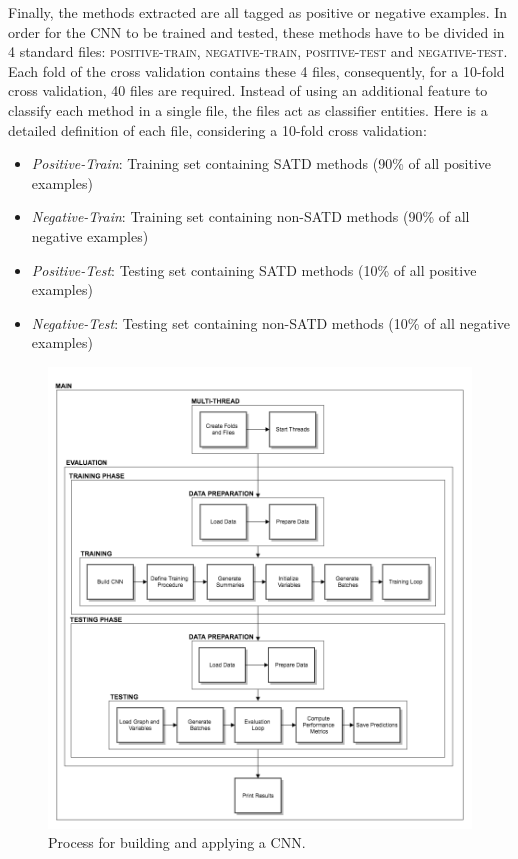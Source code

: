 Finally, the methods extracted are all tagged as positive or negative examples. In order for the CNN to be trained and tested, these methods have to be divided in 4 standard files: \textsc{positive-train}, \textsc{negative-train}, \textsc{positive-test} and \textsc{negative-test}. Each fold of the cross validation contains these 4 files, consequently, for a 10-fold cross validation, 40 files are required. Instead of using an additional feature to classify each method in a single file, the files act as classifier entities. Here is a detailed definition of each file, considering a 10-fold cross validation:

\newpage

\begin{itemize}
	\item \textit{Positive-Train}: Training set containing SATD methods (90\% of all positive examples)
	\item \textit{Negative-Train}: Training set containing non-SATD methods (90\% of all negative examples)
	\item \textit{Positive-Test}: Testing set containing SATD methods (10\% of all positive examples)
	\item \textit{Negative-Test}: Testing set containing non-SATD methods (10\% of all negative examples)
\end{itemize}

\begin{figure}
	\centering
	\includegraphics[width=\linewidth]{figs/CNNProcess.png}
	\caption{Process for building and applying a CNN.}
	\label{fig:CNNProcess}
	\vspace{-4mm}
\end{figure}

